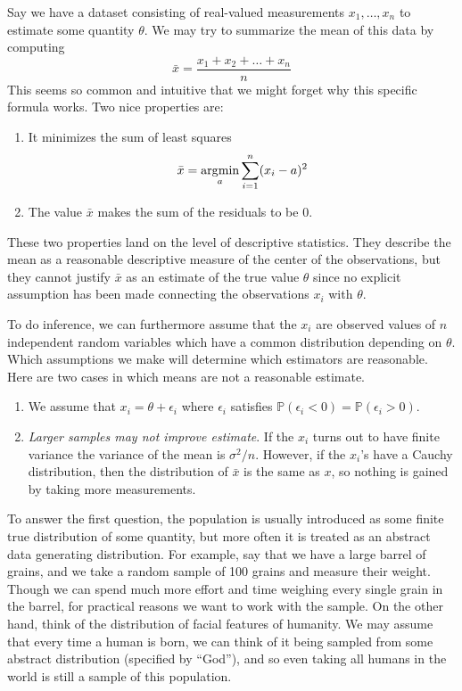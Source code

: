 \begin{example}
  Say we have a dataset consisting of real-valued measurements $x_1, \ldots, x_n$ to estimate some quantity $\theta$. We may try to summarize the mean of this data by computing 
  \begin{equation}
    \bar{x} = \frac{x_1 + x_2 + \ldots + x_n}{n} 
  \end{equation} 
  This seems so common and intuitive that we might forget why this specific formula works. Two nice properties are: 
  \begin{enumerate}
    \item It minimizes the sum of least squares 
    \begin{equation}
      \bar{x} = \argmin_{a} \sum_{i=1}^n (x_i - a)^2 
    \end{equation}

    \item The value $\bar{x}$ makes the sum of the residuals to be $0$. 
  \end{enumerate} 
  These two properties land on the level of descriptive statistics. They describe the mean as a reasonable descriptive measure of the center of the observations, but they cannot justify $\bar{x}$ as an estimate of the true value $\theta$ since no explicit assumption has been made connecting the observations $x_i$ with $\theta$. 

  To do inference, we can furthermore assume that the $x_i$ are observed values of $n$ independent random variables which have a common distribution depending on $\theta$. Which assumptions we make will determine which estimators are reasonable. Here are two cases in which means are not a reasonable estimate. 
  \begin{enumerate}
    \item We assume that $x_i = \theta + \epsilon_i$ where $\epsilon_i$ satisfies $\mathbb{P}(\epsilon_i < 0) = \mathbb{P}(\epsilon_i > 0)$. 

    \item \textit{Larger samples may not improve estimate}. If the $x_i$ turns out to have finite variance the variance of the mean is $\sigma^2 /n$. However, if the $x_i$'s have a Cauchy distribution, then the distribution of $\bar{x}$ is the same as $x$, so nothing is gained by taking more measurements. 
  \end{enumerate}
\end{example}

To answer the first question, the population is usually introduced as some finite true distribution of some quantity, but more often it is treated as an abstract data generating distribution. For example, say that we have a large barrel of grains, and we take a random sample of 100 grains and measure their weight. Though we can spend much more effort and time weighing every single grain in the barrel, for practical reasons we want to work with the sample. On the other hand, think of the distribution of facial features of humanity. We may assume that every time a human is born, we can think of it being sampled from some abstract distribution (specified by ``God''), and so even taking all humans in the world is still a sample of this population. 

